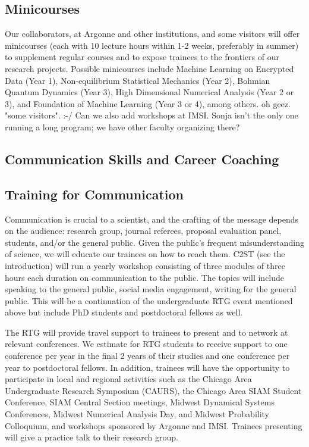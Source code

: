 \documentclass[11pt]{NSFamsart}
\begin{document}
\subsection*{Minicourses}
Our collaborators, at Argonne and other institutions, and some visitors will offer minicourses (each with 10 lecture hours within 1-2 weeks, preferably in summer) to supplement regular courses and to expose trainees to the frontiers of our research projects. Possible minicourses include  Machine Learning on Encrypted Data (Year 1),  Non-equilibrium Statistical Mechanics (Year 2),   Bohmian Quantum Dynamics (Year 3), High Dimensional Numerical Analysis (Year 2 or 3), and Foundation of Machine Learning (Year 3 or 4), among others. 
{\color{magenta}oh geez. "some visitors". :-/ Can we also add workshops at IMSI. Sonja isn't the only one running a long program; we have other faculty organizing there?} 

\subsection{Communication Skills and Career Coaching}
\subsection*{Training for Communication}
Communication is crucial to a scientist, and the crafting of the message depends on the audience:  research group, journal referees, proposal evaluation panel, students, and/or the general public.  Given the public's frequent misunderstanding of science, we will educate our trainees on how to reach them.  C2ST (see the introduction) will run a yearly workshop consisting of three modules of three hours each duration on communication to the public.  The topics will include speaking to the general public, social media engagement, writing for the general public.  This will be a continuation of the undergraduate RTG event mentioned above but include PhD students and postdoctoral fellows as well.

The RTG will provide travel support to trainees to  present   and to network at relevant conferences. We estimate for RTG students to receive support to one conference per year in the final 2 years of their studies and one conference per year to postdoctoral fellows.  In addition, trainees will have the opportunity to participate in local and regional activities such as the Chicago Area Undergraduate Research Symposium (CAURS), the Chicago Area SIAM Student Conference, SIAM Central Section meetings, Midwest Dynamical Systems Conferences, Midwest Numerical Analysis Day, and Midwest Probability Colloquium, and workshops sponsored by Argonne and IMSI. Trainees presenting will give a practice talk to their research group.
\end{document}
